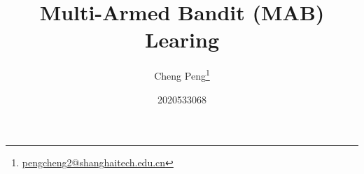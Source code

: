\documentclass{article}
\begin{document}
\title{Multi-Armed Bandit (MAB) Learing}
\author{Cheng Peng\footnote{\href{mailto:pengcheng2@shanghaitech.edu.cn}{pengcheng2@shanghaitech.edu.cn}}\and 2020533068}
\maketitle
\tableofcontents
\newpage

\newpage
\appendix
\printbibliography
\end{document}
